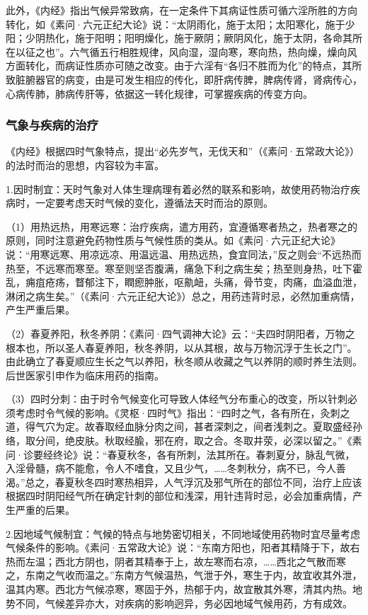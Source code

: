 \documentclass[draft,12pt]{ctexbook}
\begin{document}
此外，《内经》指出气候异常致病，在一定条件下其病证性质可循六淫所胜的方向转化，如《素问·六元正纪大论》说：“太阴雨化，施于太阳；太阳寒化，施于少阳；少阴热化，施于阳明；阳明燥化，施于厥阴；厥阴风化，施于太阴，各命其所在以征之也”。六气循五行相胜规律，风向湿，湿向寒，寒向热，热向燥，燥向风方面转化，而病证性质亦可随之改变。由于六淫有“各归不胜而为化”的特点，其所致脏腑器官的病变，由是可发生相应的传化，即肝病传脾，脾病传肾，肾病传心，心病传肺，肺病传肝等，依据这一转化规律，可掌握疾病的传变方向。

\subsubsection{气象与疾病的治疗}%

《内经》根据四时气象特点，提出“必先岁气，无伐天和”（《素问·五常政大论》）的法时而治的思想，内容较为丰富。

1.因时制宜：天时气象对人体生理病理有着必然的联系和影响，故使用药物治疗疾病时，一定要考虑天时气候的变化，遵循法天时而治的原则。

（1）用热远热，用寒远寒：治疗疾病，遣方用药，宜遵循寒者热之，热者寒之的原则，同时注意避免药物性质与气候性质的类从。如《素问·六元正纪大论》说：“用寒远寒、用凉远凉、用温远温、用热远热，食宜同法，”反之则会“不远热而热至，不远寒而寒至。寒至则坚否腹满，痛急下利之病生矣；热至则身热，吐下霍乱，痈疽疮疡，瞀郁注下，瞤瘛肿胀，呕鼽衄，头痛，骨节变，肉痛，血溢血泄，淋闭之病生矣。”（《素问·六元正纪大论》）总之，用药违背时忌，必然加重病情，产生严重后果。

（2）春夏养阳，秋冬养阴：《素问·四气调神大论》云：“夫四时阴阳者，万物之根本也，所以圣人春夏养阳，秋冬养阴，以从其根，故与万物沉浮于生长之门”。由此确立了春夏顺应生长之气以养阳，秋冬顺从收藏之气以养阴的顺时养生法则。后世医家引申作为临床用药的指南。

（3）四时分刺：由于时令气候变化可导致人体经气分布重心的改变，所以针刺必须考虑时令气候的影响。《灵枢·四时气》指出：“四时之气，各有所在，灸刺之道，得气穴为定。故春取经血脉分肉之间，甚者深刺之，间者浅刺之。夏取盛经孙络，取分间，绝皮肤。秋取经腧，邪在府，取之合。冬取井荥，必深以留之。”《素问·诊要经终论》说：“春夏秋冬，各有所刺，法其所在。春刺夏分，脉乱气微，入淫骨髓，病不能愈，令人不嗜食，又且少气，……冬刺秋分，病不已，今人善渴。”总之，春夏秋冬四时寒热相异，人气浮沉及邪气所在的部位不同，治疗上应该根据四时阴阳经气所在确定针刺的部位和浅深，用针违背时忌，必会加重病情，产生严重的后果。

2.因地域气候制宜：气候的特点与地势密切相关，不同地域使用药物时宜尽量考虑气候条件的影响。《素问·五常政大论》说：“东南方阳也，阳者其精降于下，故右热而左温；西北方阴也，阴者其精奉于上，故左寒而右凉，……西北之气散而寒之，东南之气收而温之。”东南方气候温热，气泄于外，寒生于内，故宜收其外泄，温其内寒。西北方气候凉寒，寒固于外，热郁于内，故宜散其外寒，清其内热。地势不同，气候差异亦大，对疾病的影响迥异，务必因地域气候用药，方有成效。
\end{document}
